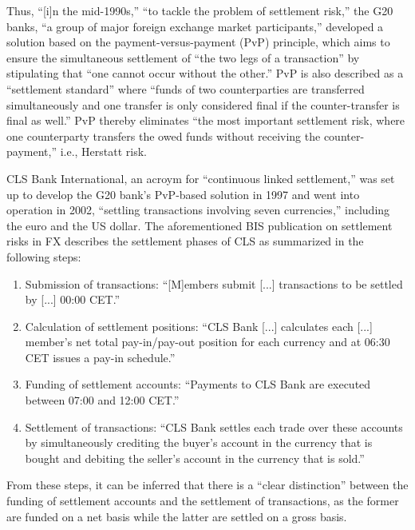 Thus, ``[i]n the mid-1990s,'' ``to tackle the problem of settlement risk,'' the G20 banks, ``a group of major foreign exchange market participants,'' developed a solution based on the payment-versus-payment (PvP) principle, which aims to ensure the simultaneous settlement of ``the two legs of a transaction'' by stipulating that ``one cannot occur without the other.'' \autocite[60]{galati2002}
PvP is also described as a ``settlement standard'' where ``funds of two counterparties are transferred simultaneously and one transfer is only considered final if the counter-transfer is final as well.'' \autocite[6]{uzh2007cls}
PvP thereby eliminates ``the most important settlement risk, where one counterparty transfers the owed funds without receiving the counter-payment,'' i.e., Herstatt risk. \autocite[6]{uzh2007cls}

CLS Bank International, an acroym for ``continuous linked settlement,'' was set up to develop the G20 bank's PvP-based solution in 1997 and went into operation in 2002, ``settling transactions involving seven currencies,'' including the euro and the US dollar. \autocite[60, 61]{galati2002}
The aforementioned BIS publication on settlement risks in FX describes the settlement phases of CLS as summarized in the following steps: \autocite[61, 62]{galati2002}

\begin{enumerate}
	\item
		Submission of transactions: ``[M]embers submit [...] transactions to be settled by [...] 00:00 CET.''
	\item
		Calculation of settlement positions: ``CLS Bank [...] calculates each [...] member's net total pay-in/pay-out position for each currency and at 06:30 CET issues a pay-in schedule.''
	\item
		Funding of settlement accounts: ``Payments to CLS Bank are executed between 07:00 and 12:00 CET.''
	\item
		Settlement of transactions: ``CLS Bank settles each trade over these accounts by simultaneously crediting the buyer’s account in the currency that is bought and debiting the seller’s account in the currency that is sold.''
\end{enumerate}

From these steps, it can be inferred that there is a ``clear distinction'' between the funding of settlement accounts and the settlement of transactions, as the former are funded on a net basis while the latter are settled on a gross basis. \autocite[62]{galati2002}

